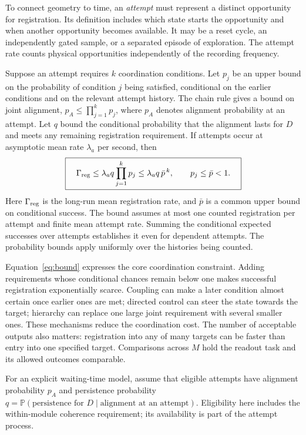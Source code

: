 \documentclass[11pt]{article}
\newcommand{\Prob}{\mathbb{P}}
\begin{document}
To connect geometry to time, an \emph{attempt} must represent a distinct
opportunity for registration. Its definition includes which state starts
the opportunity and when another opportunity becomes available. It may
be a reset cycle, an independently gated sample, or a separated episode
of exploration. The attempt rate counts physical opportunities
independently of the recording frequency.

Suppose an attempt requires $k$ coordination conditions. Let $p_j$ be an
upper bound on the probability of condition $j$ being satisfied,
conditional on the earlier conditions and on the relevant attempt
history. The chain rule gives a bound on joint alignment,
$p_A\leq\prod_{j=1}^{k}p_j$, where $p_A$ denotes alignment probability
at an attempt. Let $q$ bound the conditional probability that the
alignment lasts for $D$ and meets any remaining registration requirement.
If attempts occur at asymptotic mean rate $\lambda_a$ per second, then
\begin{equation}
 \boxed{\quad
 \Gamma_{\rm reg}\leq\lambda_a q\prod_{j=1}^{k}p_j
 \leq\lambda_a q\,\bar p^{\,k},\qquad p_j\leq\bar p<1 .
 \quad}
 \label{eq:bound}
\end{equation}
Here $\Gamma_{\rm reg}$ is the long-run mean registration rate, and
$\bar p$ is a common upper bound on conditional success. The bound
assumes at most one counted registration per attempt and finite mean
attempt rate. Summing the conditional expected successes over attempts
establishes it even for dependent attempts. The probability bounds apply
uniformly over the histories being counted.

Equation~\ref{eq:bound} expresses the core coordination constraint.
Adding requirements whose conditional chances remain below one makes
successful registration exponentially scarce. Coupling can make a later
condition almost certain once earlier ones are met; directed control can
steer the state towards the target; hierarchy can replace one large
joint requirement with several smaller ones. These mechanisms reduce the
coordination cost. The number of acceptable outputs also
matters: registration into any of many targets can be faster than entry
into one specified target. Comparisons across $M$ hold the
readout task and its allowed outcomes comparable.

For an explicit waiting-time model, assume that eligible attempts have
alignment probability $p_A$ and persistence probability
$q=\Prob(\text{persistence for }D\mid\text{alignment at an attempt})$.
Eligibility here includes the within-module coherence requirement; its
availability is part of the attempt process.
\end{document}

